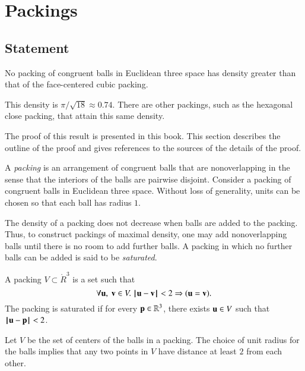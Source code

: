 



\chapter{Packings}


\section{Statement}



\begin{theorem}
\label{theorem:kepler}   No packing of congruent balls in
Euclidean three space has density greater than that of the
face-centered cubic packing.
\end{theorem}

\begin{remark}
This density is $\pi/\sqrt{18}\approx 0.74.$  There are other
packings, such as the hexagonal close packing, that attain this
same density.
\end{remark}

The proof of this result is presented in this book. This section
describes the outline of the proof and gives references to
the sources of the details of the proof.

A {\it packing} is an arrangement of congruent balls that
are nonoverlapping in the sense that the interiors of the balls are
pairwise disjoint. Consider a 
packing of congruent
balls in Euclidean three space. Without loss of generality, units can be chosen so that each ball has radius $1$.

The density of a packing does not
decrease when balls are added to the packing. Thus, to construct
packings of maximal density, one may add
nonoverlapping balls until there is no room to add further balls.
A packing in which no further balls can be added is said to be {\it saturated}.

\begin{definition}
A packing $ V\subset \ring{R}^3$ is a set such that
$$\forall  {\mathbf u},~{\mathbf v}\in  V.~  {\hskip0.1em|\hskip-0.15em|\hskip0.1em} {\mathbf u} - {\mathbf v}{\hskip0.1em|\hskip-0.15em|\hskip0.1em} < 2 \Rightarrow ( {\mathbf u}={\mathbf v}).$$
The packing is saturated if for every ${\mathbf p}\in\mathbb{R}^3$,   there exists $ {\mathbf u}\in V$
such that ${\hskip0.1em|\hskip-0.15em|\hskip0.1em} {\mathbf u} - {\mathbf p}{\hskip0.1em|\hskip-0.15em|\hskip0.1em}< 2$.
\end{definition}
%


Let $ V$ be the set of centers of the balls in a
packing. The choice of unit radius for the
balls implies that any two points in $ V$ have distance at
least $2$ from each other. 
%

